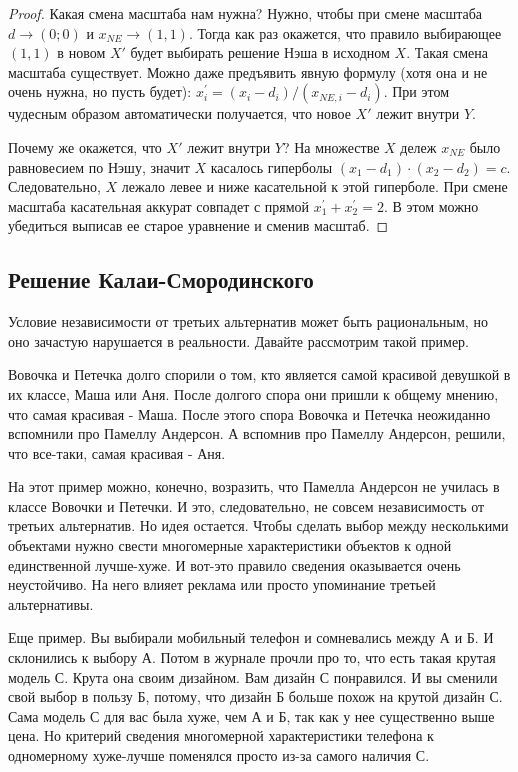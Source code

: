 \begin{proof}
Какая смена масштаба нам нужна? Нужно, чтобы при смене масштаба $d\to (0;0)$ и $x_{NE}\to (1,1)$. Тогда как раз окажется, что правило выбирающее $(1,1)$ в новом $X'$ будет выбирать решение Нэша в исходном $X$. Такая смена масштаба существует. Можно даже предъявить явную формулу (хотя она и не очень нужна, но пусть будет): $x_{i}^{'}=(x_{i}-d_{i})/(x_{NE,i}-d_{i})$. При этом чудесным образом автоматически получается, что новое $X'$ лежит внутри $Y$. 


Почему же окажется, что $X'$ лежит внутри $Y$? На множестве $X$ дележ $x_{NE}$ было равновесием по Нэшу, значит $X$ касалось гиперболы $(x_{1}-d_{1})\cdot (x_{2}-d_{2})=c$. Следовательно, $X$ лежало левее и ниже касательной к этой гиперболе. При смене масштаба касательная аккурат совпадет с прямой $x_{1}^{'}+x_{2}^{'}=2$. В этом можно убедиться выписав ее старое уравнение и сменив масштаб.

\end{proof}


\subsection{Решение Калаи-Смородинского}

Условие независимости от третьих альтернатив может быть рациональным,
но оно зачастую нарушается в реальности. Давайте рассмотрим такой
пример.

Вовочка и Петечка долго спорили о том, кто является самой красивой
девушкой в их классе, Маша или Аня. После долгого спора они пришли
к общему мнению, что самая красивая - Маша. После этого спора Вовочка
и Петечка неожиданно вспомнили про Памеллу Андерсон. А вспомнив про
Памеллу Андерсон, решили, что все-таки, самая красивая - Аня.

На этот пример можно, конечно, возразить, что Памелла Андерсон не
училась в классе Вовочки и Петечки. И это, следовательно, не совсем
независимость от третьих альтернатив. Но идея остается. Чтобы сделать
выбор между несколькими объектами нужно свести многомерные характеристики
объектов к одной единственной лучше-хуже. И вот-это правило сведения
оказывается очень неустойчиво. На него влияет реклама или просто упоминание
третьей альтернативы.

Еще пример. Вы выбирали мобильный телефон и сомневались между А и
Б. И склонились к выбору А. Потом в журнале прочли про то, что есть
такая крутая модель С. Крута она своим дизайном. Вам дизайн С понравился.
И вы сменили свой выбор в пользу Б, потому, что дизайн Б больше похож
на крутой дизайн С. Сама модель С для вас была хуже, чем А и Б, так
как у нее существенно выше цена. Но критерий сведения многомерной
характеристики телефона к одномерному хуже-лучше поменялся просто
из-за самого наличия С.

